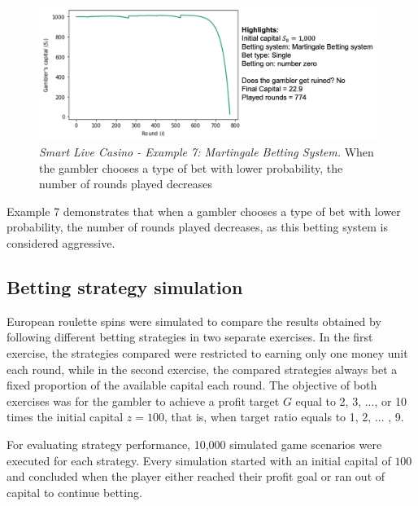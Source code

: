 \documentclass[11pt,twoside]{article}
\numberwithin{Theorem}{section}
\numberwithin{Definition}{section}
\numberwithin{Lemma}{section}
\numberwithin{Algorithm}{section}
\numberwithin{equation}{section}
\begin{document}
\begin{figure}[H]
        \centering
        \includegraphics[width=11cm]{sim_05.png}
        \caption[Smart Live Casino - Example 7: Martingale Betting System]{\textit{Smart Live Casino - Example 7: Martingale Betting System.} When the gambler chooses a type of bet with lower probability, the number of rounds played decreases}\label{sim_live_05}
\end{figure}


Example 7 demonstrates that when a gambler chooses a type of bet with lower probability, the number of rounds played decreases, as this betting system is considered aggressive.

\subsection{Betting strategy simulation}
European roulette spins were simulated to compare the results obtained by following different betting strategies in two separate exercises. In the first exercise, the strategies compared were restricted to earning only one money unit each round, while in the second exercise, the compared strategies always bet a fixed proportion of the available capital each round. The objective of both exercises was for the gambler to achieve a profit target $G$ equal to 2, 3, ..., or 10 times the initial capital $z= 100$, that is, when target ratio equals to 1, 2, ... , 9.

For evaluating strategy performance, 10,000 simulated game scenarios were executed for each strategy. Every simulation started with an initial capital of $100$ and concluded when the player either reached their profit goal or ran out of capital to continue betting.
\end{document}
